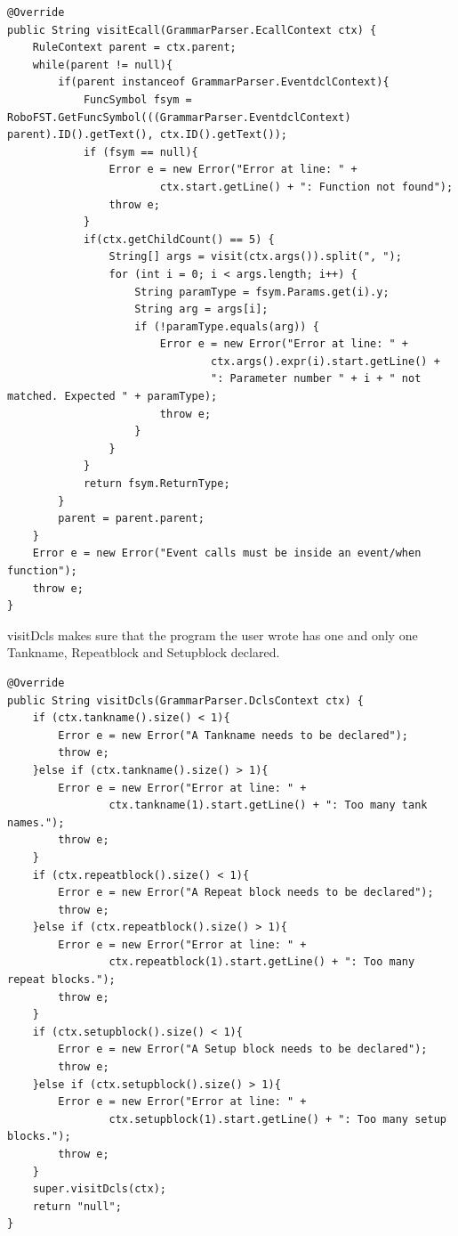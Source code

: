 \begin{lstlisting}[caption={SymbolTypeVisitor - visitEcall function}, label={VE}]
@Override
public String visitEcall(GrammarParser.EcallContext ctx) {
    RuleContext parent = ctx.parent;
    while(parent != null){
        if(parent instanceof GrammarParser.EventdclContext){
            FuncSymbol fsym = RoboFST.GetFuncSymbol(((GrammarParser.EventdclContext) parent).ID().getText(), ctx.ID().getText());
            if (fsym == null){
                Error e = new Error("Error at line: " +
                        ctx.start.getLine() + ": Function not found");
                throw e;
            }
            if(ctx.getChildCount() == 5) {
                String[] args = visit(ctx.args()).split(", ");
                for (int i = 0; i < args.length; i++) {
                    String paramType = fsym.Params.get(i).y;
                    String arg = args[i];
                    if (!paramType.equals(arg)) {
                        Error e = new Error("Error at line: " +
                                ctx.args().expr(i).start.getLine() +
                                ": Parameter number " + i + " not matched. Expected " + paramType);
                        throw e;
                    }
                }
            }
            return fsym.ReturnType;
        }
        parent = parent.parent;
    }
    Error e = new Error("Event calls must be inside an event/when function");
    throw e;
}
\end{lstlisting}

visitDcls makes sure that the program the user wrote has one and only one Tankname, Repeatblock and Setupblock declared. 

\begin{lstlisting}[caption={SymbolTypeVisitor - visitDcls function}, label={VD}]
@Override
public String visitDcls(GrammarParser.DclsContext ctx) {
    if (ctx.tankname().size() < 1){
        Error e = new Error("A Tankname needs to be declared");
        throw e;
    }else if (ctx.tankname().size() > 1){
        Error e = new Error("Error at line: " +
                ctx.tankname(1).start.getLine() + ": Too many tank names.");
        throw e;
    }
    if (ctx.repeatblock().size() < 1){
        Error e = new Error("A Repeat block needs to be declared");
        throw e;
    }else if (ctx.repeatblock().size() > 1){
        Error e = new Error("Error at line: " +
                ctx.repeatblock(1).start.getLine() + ": Too many repeat blocks.");
        throw e;
    }
    if (ctx.setupblock().size() < 1){
        Error e = new Error("A Setup block needs to be declared");
        throw e;
    }else if (ctx.setupblock().size() > 1){
        Error e = new Error("Error at line: " +
                ctx.setupblock(1).start.getLine() + ": Too many setup blocks.");
        throw e;
    }
    super.visitDcls(ctx);
    return "null";
}
\end{lstlisting}



